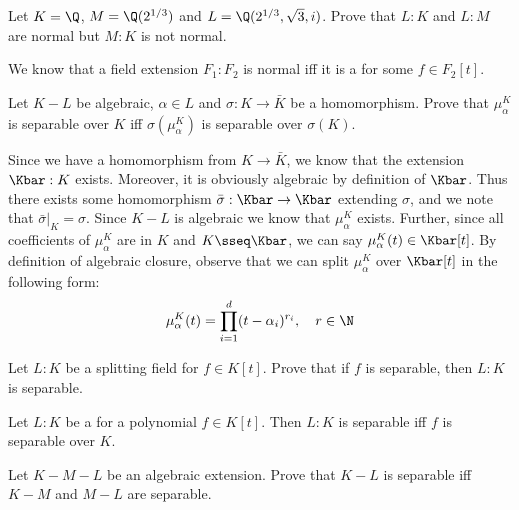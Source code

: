 \documentclass{article}
\begin{document}
\setcounter{section}{7} %
\begin{exercise}
Let $ K = \Q $, $ M = \Q(2^{1/3}) $ and $ L = \Q(2^{1/3}, \sqrt 3, i) $.
Prove that $ L:K $ and $ L:M $ are normal but $ M:K $ is not normal.
\end{exercise}
\begin{solution}
We know that a field extension $ F_1:F_2 $ is normal iff it is a \sfe for some $ f\in F_2[t] $.

\end{solution}
\pagebreak

\begin{subexercise}
  Let $ K-L $ be algebraic, $ \alpha\in L $ and $ \sigma:K\to \bar K $ be a homomorphism.
  Prove that $ \mu_\alpha^K $ is separable over $ K $ iff $ \sigma(\mu_\alpha^K) $ is separable over $ \sigma(K) $.
\end{subexercise}
\begin{solution}
  Since we have a homomorphism from $ K\to \bar K $, we know that the extension $ \Kbar:K $ exists.
  Moreover, it is obviously algebraic by definition of $ \Kbar $.
  Thus there exists some homomorphism $ \bar\sigma:\Kbar\to\Kbar $ extending $ \sigma $, and we note that $ \bar\sigma|_{K} = \sigma $.
  Since $ K-L $ is algebraic we know that $ \mu_\alpha^K $ exists.
  Further, since all coefficients of $ \mu_\alpha^K $ are in $ K $ and $ K \sseq \Kbar $, we can say $ \mu_\alpha^K(t)\in \Kbar[t] $.
  By definition of algebraic closure, observe that we can split $ \mu_\alpha^K $ over $ \Kbar[t] $ in the following form: \begin{align*}
    \mu_\alpha^K(t) = \prod_{i=1}^{d}(t-\alpha_i)^{r_i},\quad r\in \N
  \end{align*}
\end{solution}
\pagebreak

\begin{subexercise}
  Let $ L:K $ be a splitting field for $ f\in K[t] $.
  Prove that if $ f $ is separable, then $ L:K $ is separable.
\end{subexercise}
\begin{solution}

\end{solution}
\pagebreak

\begin{exercise}
  Let $ L:K $ be a \sfe for a polynomial $ f\in K[t] $.
  Then $ L:K $ is separable iff $ f $ is separable over $ K $.
\end{exercise}
\begin{solution}

\end{solution}
\pagebreak

\begin{exercise}
  Let $ K-M-L $ be an algebraic extension.
  Prove that $ K-L $ is separable iff $ K-M $ and $ M-L $ are separable.
\end{exercise}
\begin{solution}

\end{solution}
\end{document}
